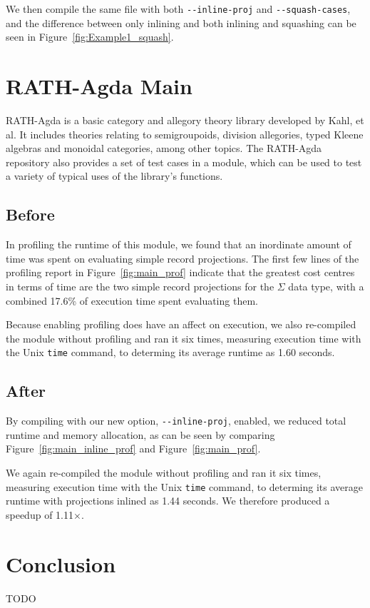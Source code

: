 We then compile the same file with both \texttt{-{}-inline-proj} and \texttt{-{}-squash-cases}, and the difference between only inlining and both inlining and squashing can be seen in Figure~\ref{fig:Example1_squash}.

\section{RATH-Agda Main}
\label{sec:app_one}

RATH-Agda is a basic category and allegory theory library developed by Kahl, et al.\cite{kahl2017} It includes theories relating to semigroupoids, division allegories, typed Kleene algebras and monoidal categories, among other topics.\cite{kahl2017} The RATH-Agda repository also provides a set of test cases in a  module, which can be used to test a variety of typical uses of the library's functions.

\subsection{Before}



In profiling the runtime of this  module, we found that an inordinate amount of time was spent on evaluating simple record projections. The first few lines of the profiling report in Figure~\ref{fig:main_prof} indicate that the greatest cost centres in terms of time are the two simple record projections for the $\Sigma$ data type, with a combined 17.6\% of execution time spent evaluating them.

Because enabling profiling does have an affect on execution, we also re-compiled the module without profiling and ran it six times, measuring execution time with the Unix \texttt{time} command, to determing its average runtime as 1.60 seconds.

\subsection{After}



By compiling  with our new option, \texttt{-{}-inline-proj}, enabled, we reduced total runtime and memory allocation, as can be seen by comparing Figure~\ref{fig:main_inline_prof} and Figure~\ref{fig:main_prof}.

We again re-compiled the module without profiling and ran it six times, measuring execution time with the Unix \texttt{time} command, to determing its average runtime with projections inlined as 1.44 seconds. We therefore produced a speedup of 1.11$\times$.


\section{Conclusion}
\label{sec:application_conclusion}

TODO

